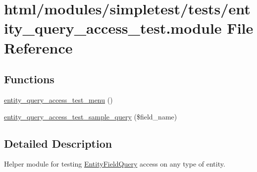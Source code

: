 \hypertarget{entity__query__access__test_8module}{
\section{html/modules/simpletest/tests/entity\_\-query\_\-access\_\-test.module File Reference}
\label{entity__query__access__test_8module}
}
\subsection*{Functions}
\begin{DoxyCompactItemize}
\item 
\hyperlink{entity__query__access__test_8module_af30f2c1b4e455c530c3f057bb49a6cd5}{entity\_\-query\_\-access\_\-test\_\-menu} ()
\item 
\hyperlink{entity__query__access__test_8module_a6d912898f4447e168aaac37d8a64e14a}{entity\_\-query\_\-access\_\-test\_\-sample\_\-query} (\$field\_\-name)
\end{DoxyCompactItemize}


\subsection{Detailed Description}
Helper module for testing \hyperlink{classEntityFieldQuery}{EntityFieldQuery} access on any type of entity. 

